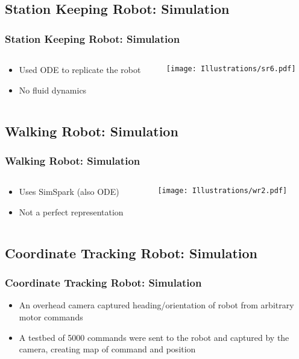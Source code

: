 \documentclass{beamer}
\begin{document}
\subsection{Station Keeping Robot: Simulation}
\begin{frame}
  \frametitle{Station Keeping Robot: Simulation}
\begin{columns}
  \begin{column}{0.5\textwidth}
\begin{itemize}
\item  Used ODE to replicate the robot
\item  No fluid dynamics
\end{itemize}
\end{column}
\begin{column}{0.5\textwidth}
 \texttt{[image: Illustrations/sr6.pdf]}
       \\
\end{column}
\end{columns}
\end{frame}

\subsection{Walking Robot: Simulation}
\begin{frame}
  \frametitle{Walking Robot: Simulation}
\begin{columns}
  \begin{column}{0.5\textwidth}
\begin{itemize}
\item  Uses SimSpark (also ODE)
\item  Not a perfect representation
\end{itemize}
\end{column}
\begin{column}{0.5\textwidth}
 \texttt{[image: Illustrations/wr2.pdf]}
       \\
\end{column}
\end{columns}
\end{frame}

\subsection{Coordinate Tracking Robot: Simulation}
\begin{frame}
  \frametitle{Coordinate Tracking Robot: Simulation}
\begin{itemize}
\item An overhead camera captured heading/orientation of robot from arbitrary motor commands
\item A testbed of 5000 commands were sent to the robot and captured by the camera, creating map of command and position
\end{itemize}
\end{frame}
\end{document}

